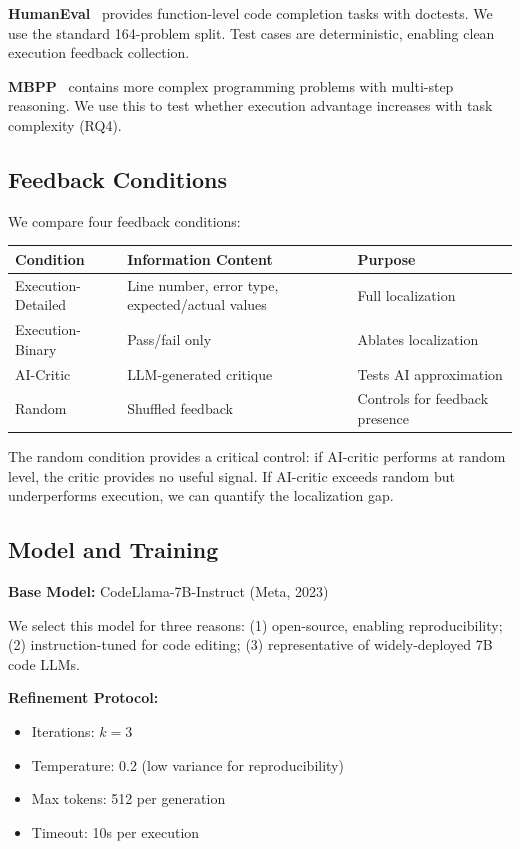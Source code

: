 \textbf{HumanEval}~\cite{chen2021evaluating} provides function-level code completion tasks with doctests. We use the standard 164-problem split. Test cases are deterministic, enabling clean execution feedback collection.

\textbf{MBPP}~\cite{austin2021program} contains more complex programming problems with multi-step reasoning. We use this to test whether execution advantage increases with task complexity (RQ4).

\subsection{Feedback Conditions}

We compare four feedback conditions:

\begin{table}[h]
\centering
\begin{tabular}{@{}lll@{}}
\toprule
\textbf{Condition} & \textbf{Information Content} & \textbf{Purpose} \\
\midrule
Execution-Detailed & Line number, error type, expected/actual values & Full localization \\
Execution-Binary & Pass/fail only & Ablates localization \\
AI-Critic & LLM-generated critique & Tests AI approximation \\
Random & Shuffled feedback & Controls for feedback presence \\
\bottomrule
\end{tabular}
\end{table}

The random condition provides a critical control: if AI-critic performs at random level, the critic provides no useful signal. If AI-critic exceeds random but underperforms execution, we can quantify the localization gap.

\subsection{Model and Training}

\textbf{Base Model:} CodeLlama-7B-Instruct (Meta, 2023)

We select this model for three reasons: (1) open-source, enabling reproducibility; (2) instruction-tuned for code editing; (3) representative of widely-deployed 7B code LLMs.

\textbf{Refinement Protocol:}
\begin{itemize}
\item Iterations: $k=3$
\item Temperature: 0.2 (low variance for reproducibility)
\item Max tokens: 512 per generation
\item Timeout: 10s per execution
\end{itemize}

